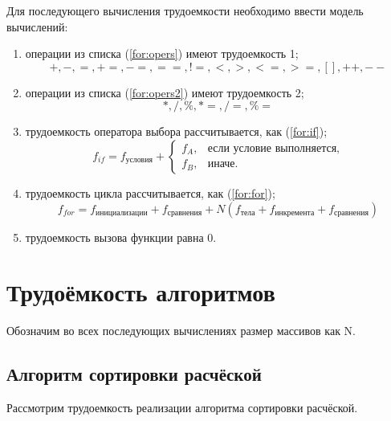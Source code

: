 Для последующего вычисления трудоемкости необходимо ввести модель вычислений:
\begin{enumerate}
    \item операции из списка (\ref{for:opers}) имеют трудоемкость 1;
        \begin{equation}
            \label{for:opers}
            +, -, =, +=, -=, ==, !=, <, >, <=, >=, [], ++, {-}-
        \end{equation}
    \item операции из списка (\ref{for:opers2}) имеют трудоемкость 2;
        \begin{equation}
            \label{for:opers2}
            *, /, \%, *=, /=, \%=
        \end{equation}
    \item трудоемкость оператора выбора  рассчитывается, как (\ref{for:if});
        \begin{equation}
            \label{for:if}
            f_{if} = f_{\text{условия}} +
            \begin{cases}
            f_A, & \text{если условие выполняется,}\\
            f_B, & \text{иначе.}
            \end{cases}
        \end{equation}
    \item трудоемкость цикла рассчитывается, как (\ref{for:for});
        \begin{equation}
            \label{for:for}
            f_{for} = f_{\text{инициализации}} + f_{\text{сравнения}} + N(f_{\text{тела}} + f_{\text{инкремента}} + f_{\text{сравнения}})
        \end{equation}
	\item трудоемкость вызова функции равна 0.
\end{enumerate}


\section{Трудоёмкость алгоритмов}

Обозначим во всех последующих вычислениях размер массивов как N.

\subsection{Алгоритм сортировки расчёской}

Рассмотрим трудоемкость реализации алгоритма сортировки расчёской.

